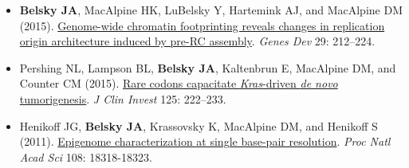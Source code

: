 
\vspace{-2mm}
\begin{resentries}

\begin{itemize}[leftmargin=!, labelindent=5pt, itemindent=-15pt, nosep]
	\setlength{\itemsep}{2pt}
	\item{\textbf{Belsky JA}, MacAlpine HK, LuBelsky Y, Hartemink AJ, and MacAlpine DM (2015).  \href{http://dx.doi.org/10.1101/gad.247924.114}{\color{blue} Genome-wide chromatin footprinting reveals changes in replication origin architecture induced by pre-RC assembly}.  \textit{Genes Dev} 29: 212--224.}
	\item{Pershing NL, Lampson BL, \textbf{Belsky JA}, Kaltenbrun E, MacAlpine DM, and Counter CM (2015).  \href{http://dx.doi.org/10.1172/JCI77627}{\color{blue} Rare codons capacitate \textit{Kras}-driven \textit{de novo} tumorigenesis}.  \textit{J Clin Invest} 125: 222--233.}
	\item{Henikoff JG, \textbf{Belsky JA}, Krassovsky K, MacAlpine DM, and Henikoff S (2011).  \href{http://dx.doi.org/10.1073/pnas.1110731108}{\color{blue} Epigenome characterization at single base-pair resolution}.  \textit{Proc Natl Acad Sci} 108: 18318-18323.}

\end{itemize}

\end{resentries}
\vspace{-1mm}
